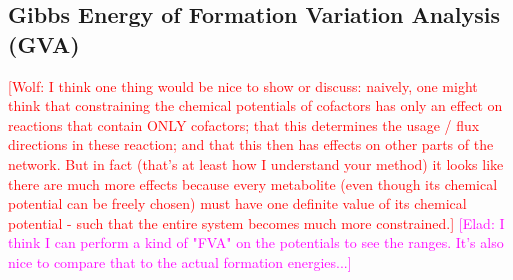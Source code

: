 \documentclass[twocolumn]{bmcart}%
\newcommand{\wolf}[1]{{\textcolor{red}{[Wolf: {#1}]}}}
\newcommand{\elad}[1]{{\textcolor{magenta}{[Elad: {#1}]}}}
\begin{document}
\subsection{Gibbs Energy of Formation Variation Analysis (GVA)}

\wolf{I think one thing would be nice to show or discuss: naively, one might think that constraining the chemical potentials of cofactors has only an effect on reactions that contain ONLY cofactors; that this determines the usage / flux directions in these reaction; and that this then has effects on other parts of the network. But in fact (that's at least how I understand your method) it looks like there are much more effects because every metabolite (even though its chemical potential can be freely chosen) must have one definite value of its chemical potential - such that the entire system becomes much more constrained.}
\elad{I think I can perform a kind of "FVA" on the potentials to see the ranges. It's also nice to compare that to the actual formation energies...}
\end{document}
